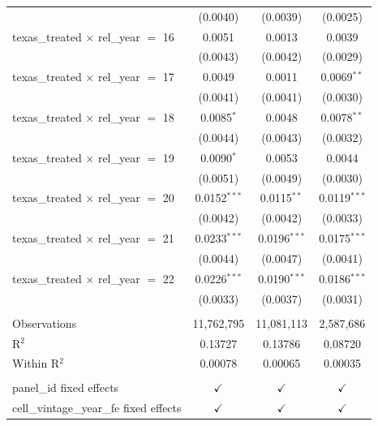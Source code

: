 \begin{tabular}{lccc}
                                                & (0.0040)        & (0.0039)        & (0.0025)\\   
   texas\_treated $\times$ rel\_year $=$ 16     & 0.0051          & 0.0013          & 0.0039\\   
                                                & (0.0043)        & (0.0042)        & (0.0029)\\   
   texas\_treated $\times$ rel\_year $=$ 17     & 0.0049          & 0.0011          & 0.0069$^{**}$\\   
                                                & (0.0041)        & (0.0041)        & (0.0030)\\   
   texas\_treated $\times$ rel\_year $=$ 18     & 0.0085$^{*}$    & 0.0048          & 0.0078$^{**}$\\   
                                                & (0.0044)        & (0.0043)        & (0.0032)\\   
   texas\_treated $\times$ rel\_year $=$ 19     & 0.0090$^{*}$    & 0.0053          & 0.0044\\   
                                                & (0.0051)        & (0.0049)        & (0.0030)\\   
   texas\_treated $\times$ rel\_year $=$ 20     & 0.0152$^{***}$  & 0.0115$^{**}$   & 0.0119$^{***}$\\   
                                                & (0.0042)        & (0.0042)        & (0.0033)\\   
   texas\_treated $\times$ rel\_year $=$ 21     & 0.0233$^{***}$  & 0.0196$^{***}$  & 0.0175$^{***}$\\   
                                                & (0.0044)        & (0.0047)        & (0.0041)\\   
   texas\_treated $\times$ rel\_year $=$ 22     & 0.0226$^{***}$  & 0.0190$^{***}$  & 0.0186$^{***}$\\   
                                                & (0.0033)        & (0.0037)        & (0.0031)\\   
    \\
   Observations                                 & 11,762,795      & 11,081,113      & 2,587,686\\  
   R$^2$                                        & 0.13727         & 0.13786         & 0.08720\\  
   Within R$^2$                                 & 0.00078         & 0.00065         & 0.00035\\  
    \\
   panel\_id fixed effects                      & $\checkmark$    & $\checkmark$    & $\checkmark$\\   
   cell\_vintage\_year\_fe fixed effects        & $\checkmark$    & $\checkmark$    & $\checkmark$\\   
   \bottomrule
\end{tabular}
\par\endgroup


